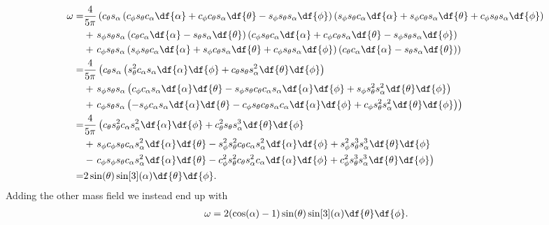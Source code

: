\begin{align*}
	\omega =& \frac{4}{5\pi}\left(c_{\theta}s_{\alpha}\left(c_{\phi}s_{\theta}c_{\alpha}\df{\alpha} + c_{\phi}c_{\theta}s_{\alpha}\df{\theta} - s_{\phi}s_{\theta}s_{\alpha}\df{\phi}\right)\left(s_{\phi}s_{\theta}c_{\alpha}\df{\alpha} + s_{\phi}c_{\theta}s_{\alpha}\df{\theta} + c_{\phi}s_{\theta}s_{\alpha}\df{\phi}\right) \right. \\
	&+ \left. s_{\phi}s_{\theta}s_{\alpha}\left(c_{\theta}c_{\alpha}\df{\alpha} - s_{\theta}s_{\alpha}\df{\theta}\right)\left(c_{\phi}s_{\theta}c_{\alpha}\df{\alpha} + c_{\phi}c_{\theta}s_{\alpha}\df{\theta} - s_{\phi}s_{\theta}s_{\alpha}\df{\phi}\right) \right. \\
	&+ \left. c_{\phi}s_{\theta}s_{\alpha}\left(s_{\phi}s_{\theta}c_{\alpha}\df{\alpha} + s_{\phi}c_{\theta}s_{\alpha}\df{\theta} + c_{\phi}s_{\theta}s_{\alpha}\df{\phi}\right)\left(c_{\theta}c_{\alpha}\df{\alpha} - s_{\theta}s_{\alpha}\df{\theta}\right)\right) \\
	=& \frac{4}{5\pi}\left(c_{\theta}s_{\alpha}\left(s_{\theta}^{2}c_{\alpha}s_{\alpha}\df{\alpha}\df{\phi} + c_{\theta}s_{\theta}s_{\alpha}^{2}\df{\theta}\df{\phi}\right) \right. \\
	&+ \left. s_{\phi}s_{\theta}s_{\alpha}\left(c_{\phi}c_{\alpha}s_{\alpha}\df{\alpha}\df{\theta} - s_{\phi}s_{\theta}c_{\theta}c_{\alpha}s_{\alpha}\df{\alpha}\df{\phi} + s_{\phi}s_{\theta}^{2}s_{\alpha}^{2}\df{\theta}\df{\phi}\right) \right. \\
	&+ \left. c_{\phi}s_{\theta}s_{\alpha}\left(-s_{\phi}c_{\alpha}s_{\alpha}\df{\alpha}\df{\theta} - c_{\phi}s_{\theta}c_{\theta}s_{\alpha}c_{\alpha}\df{\alpha}\df{\phi} + c_{\phi}s_{\theta}^{2}s_{\alpha}^{2}\df{\theta}\df{\phi}\right)\right) \\
	=& \frac{4}{5\pi}\left(c_{\theta}s_{\theta}^{2}c_{\alpha}s_{\alpha}^{2}\df{\alpha}\df{\phi} + c_{\theta}^{2}s_{\theta}s_{\alpha}^{3}\df{\theta}\df{\phi} \right. \\
	&+ \left. s_{\phi}c_{\phi}s_{\theta}c_{\alpha}s_{\alpha}^{2}\df{\alpha}\df{\theta} - s_{\phi}^{2}s_{\theta}^{2}c_{\theta}c_{\alpha}s_{\alpha}^{2}\df{\alpha}\df{\phi} + s_{\phi}^{2}s_{\theta}^{3}s_{\alpha}^{3}\df{\theta}\df{\phi} \right. \\
	&- \left. c_{\phi}s_{\phi}s_{\theta}c_{\alpha}s_{\alpha}^{2}\df{\alpha}\df{\theta} - c_{\phi}^{2}s_{\theta}^{2}c_{\theta}s_{\alpha}^{2}c_{\alpha}\df{\alpha}\df{\phi} + c_{\phi}^{2}s_{\theta}^{3}s_{\alpha}^{3}\df{\theta}\df{\phi}\right) \\
	=& 2\sin(\theta)\sin[3](\alpha)\df{\theta}\df{\phi}.
\end{align*}
Adding the other mass field we instead end up with
\begin{align*}
	\omega = 2(\cos(\alpha) - 1)\sin(\theta)\sin[3](\alpha)\df{\theta}\df{\phi}.
\end{align*}

